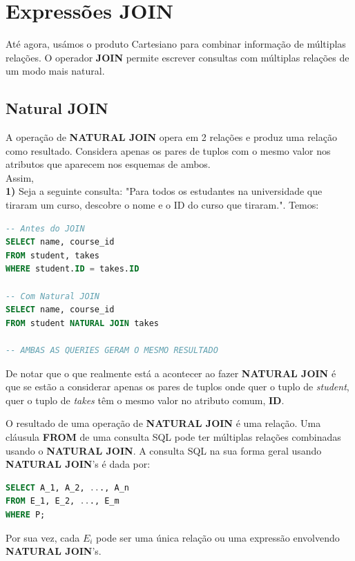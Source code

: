 \documentclass[oneside]{book}
\theoremstyle{definition}
\begin{document}
\section{Expressões JOIN}
Até agora, usámos o produto Cartesiano para combinar informação de múltiplas relações. O operador \textbf{JOIN} permite escrever consultas com múltiplas relações de um modo mais natural.

\subsection{Natural JOIN} 
A operação de \textbf{NATURAL JOIN} opera em 2 relações e produz uma relação como resultado. Considera apenas os pares de tuplos com o mesmo valor nos atributos que aparecem nos esquemas de ambos. \\
Assim, \\
\textbf{1)} Seja a seguinte consulta: "Para todos os estudantes na universidade que tiraram um curso, descobre o nome e o ID do curso que tiraram.". Temos:
\begin{lstlisting}[language=SQL, morekeywords={REFERENCES, REFRESH, MATERIALIZED, CONCURRENTLY}, framesep=8pt, xleftmargin=40pt, framexleftmargin=40pt, frame=tb, framerule=0pt]
-- Antes do JOIN
SELECT name, course_id
FROM student, takes
WHERE student.ID = takes.ID

-- Com Natural JOIN
SELECT name, course_id
FROM student NATURAL JOIN takes

-- AMBAS AS QUERIES GERAM O MESMO RESULTADO
\end{lstlisting}

De notar que o que realmente está a acontecer ao fazer \textbf{NATURAL JOIN} é que se estão a considerar apenas os pares de tuplos onde quer o tuplo de \textit{student}, quer o tuplo de \textit{takes} têm o mesmo valor no atributo comum, \textbf{ID}.

O resultado de uma operação de \textbf{NATURAL JOIN} é uma relação. Uma cláusula \textbf{FROM} de uma consulta SQL pode ter múltiplas relações combinadas usando o \textbf{NATURAL JOIN}. A consulta SQL na sua forma geral usando \textbf{NATURAL JOIN}'s é dada por:
\begin{lstlisting}[language=SQL, morekeywords={REFERENCES, REFRESH, MATERIALIZED, CONCURRENTLY}, framesep=8pt, xleftmargin=40pt, framexleftmargin=40pt, frame=tb, framerule=0pt]
SELECT A_1, A_2, ..., A_n
FROM E_1, E_2, ..., E_m
WHERE P;
\end{lstlisting}

Por sua vez, cada $E_i$ pode ser uma única relação ou uma expressão envolvendo \textbf{NATURAL JOIN}'s.
\end{document}
